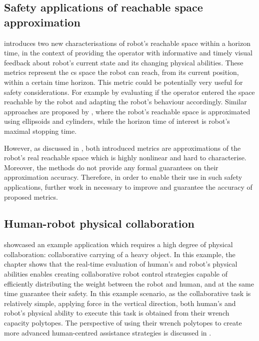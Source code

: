 \subsection{Safety applications of reachable space approximation}

 introduces two new characterisations of robot's reachable space within a horizon time, in the context of providing the operator with informative and timely visual feedback about robot's current state and its changing physical abilities. These metrics represent the \gls{cs} space the robot can reach, from its current position, within a certain time horizon. This metric could be potentially very useful for safety considerations. For example by evaluating if the operator entered the space reachable by the robot and adapting the robot's behaviour accordingly. Similar approaches are proposed by \citet{pereira2017,schepp2022}, where the robot's reachable space is approximated using ellipsoids and cylinders, while the horizon time of interest is robot's maximal stopping time. 

However, as discussed in , both introduced metrics are approximations of the robot's real reachable space which is highly nonlinear and hard to characterise. Moreover, the methods do not provide any formal guarantees on their approximation accuracy. Therefore, in order to enable their use in such safety applications, further work in necessary to improve and guarantee the accuracy of proposed metrics.  


\subsection{Human-robot physical collaboration}

 showcased an example application which requires a high degree of physical collaboration: collaborative carrying of a heavy object. In this example, the chapter shows that the real-time evaluation of human's and robot's physical abilities enables creating collaborative robot control strategies capable of efficiently distributing the weight between the robot and human, and at the same time guarantee their safety. In this example scenario, as the collaborative task is relatively simple, applying force in the vertical direction, both human's and robot's physical ability to execute this task is obtained from their wrench capacity polytopes. The perspective of using their wrench polytopes to create more advanced human-centred assistance strategies is discussed in .

